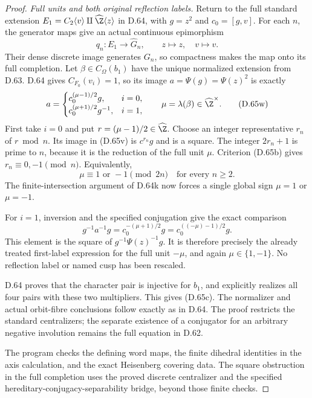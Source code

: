 \begin{proof}
\emph{Full units and both original reflection labels.}
Return to the full standard extension
$E_1=C_2\langle v\rangle\amalg\widehat\Z\langle z\rangle$
in D.64, with $g=z^2$ and $c_0=[g,v]$.
For each $n$, the generator maps give an actual
continuous epimorphism
\[
           q_n:E_1\longrightarrow\widehat G_n,\qquad
                              z\longmapsto z,\quad v\longmapsto v.
                                                               \tag{D.65v}
\]
Their dense discrete image generates $G_n$, so
compactness makes the map onto its full completion.
Let $\beta\in C_\Omega(b_1)$ have the unique
normalized extension from D.63.
D.64 gives $C_{F_0}(v_i)=1$, so its image
$a=\Psi(g)=\Psi(z)^2$ is exactly
\[
 a=
 \begin{cases}
   c_0^{(\mu-1)/2}g,&i=0,\\
   c_0^{(\mu+1)/2}g^{-1},&i=1,
 \end{cases}
 \qquad \mu=\lambda(\beta)\in\widehat\Z^\times .
                                                               \tag{D.65w}
\]
First take $i=0$ and put $r=(\mu-1)/2\in\widehat\Z$.
Choose an integer representative $r_n$ of $r\bmod n$.
Its image in (D.65v) is $c^{r_n}g$ and is a square.
The integer $2r_n+1$ is prime to $n$, because it
is the reduction of the full unit $\mu$.
Criterion (D.65b) gives
$r_n\equiv0,-1\pmod n$.
Equivalently,
\[
                         \mu\equiv1\text{ or }-1\pmod{2n}
                             \quad\text{for every }n\geq2.
                                                               \tag{D.65x}
\]
The finite-intersection argument of D.64k now
forces a single global sign $\mu=1$ or $\mu=-1$.

For $i=1$, inversion and the specified conjugation
give the exact comparison
\[
        g^{-1}a^{-1}g
            =c_0^{-(\mu+1)/2}g
            =c_0^{((-\mu)-1)/2}g .
                                                               \tag{D.65y}
\]
This element is the square of
$g^{-1}\Psi(z)^{-1}g$.
It is therefore precisely the already treated
first-label expression for the full unit $-\mu$,
and again $\mu\in\{1,-1\}$.
No reflection label or named cusp has been rescaled.

D.64 proves that the character pair is injective
for $b_1$, and explicitly realizes all four pairs
with these two multipliers.
This gives (D.65c).
The normalizer and actual orbit-fibre conclusions
follow exactly as in D.64.
The proof restricts the standard centralizers;
the separate existence of a conjugator for an
arbitrary negative involution remains the full
equation in D.62.

The program
checks the defining word maps, the finite
dihedral identities in the axis calculation,
and the exact Heisenberg covering data.
The square obstruction in the full completion
uses the proved discrete centralizer and the
specified hereditary-conjugacy-separability bridge,
beyond those finite checks.
\end{proof}
